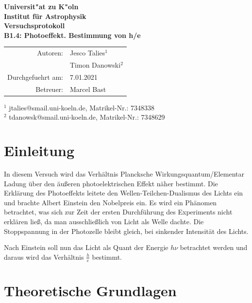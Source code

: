 \documentclass{scrartcl}
\begin{document}
\thispagestyle{empty}
\vspace*{\fill}
\begin{center}
	\Huge
	\textbf{Universit"at zu K"oln}\\
	\LARGE
	\textbf{Institut für Astrophysik}\\
	\vspace{2cm}
	\textbf{Versuchsprotokoll}\\
	\vspace{0.5cm}
	\large
	\textbf{B1.4: Photoeffekt. Bestimmung von h/e}\\
	\normalsize
	\vspace{2cm}
	\begin{tabular}{r l}
		Autoren: 	& Jesco Talies$^1$\\
					& Timon Danowski$^2$\\
		Durchgefuehrt am:	& 7.01.2021\\
		Betreuer:	& Marcel Bast
	\end{tabular}
\end{center}
\vfill\footnotesize
$^1$ jtalies@smail.uni-koeln.de, Matrikel-Nr.: 7348338\\
$^2$ tdanowsk@smail.uni-koeln.de, Matrikel-Nr.: 7348629\\
\normalsize

\newpage
\thispagestyle{empty}
\tableofcontents
\clearpage
\setcounter{page}{1}





\section{Einleitung}
	In diesem Versuch wird das Verhältnis Plancksche Wirkungsquantum/Elementar Ladung über den äußeren photoelektrischen Effekt
	näher bestimmt.
	Die Erklärung des Photoeffekts leitete den Wellen-Teilchen-Dualismus des Lichts ein und brachte
	Albert Einstein den Nobelpreis ein. Es wird ein Phänomen betrachtet, was sich zur Zeit der
	ersten Durchführung des Experiments nicht erklären ließ, da man ausschließlich von Licht als Welle dachte.
	Die Stoppspannung in der Photozelle bleibt gleich, bei sinkender Intensität des Lichts.
	
	Nach Einstein soll nun das Licht als Quant der Energie $h\nu$ betrachtet werden und daraus 
	wird das Verhältnis $\frac{h}{e}$ bestimmt.
\section{Theoretische Grundlagen}
\end{document}
